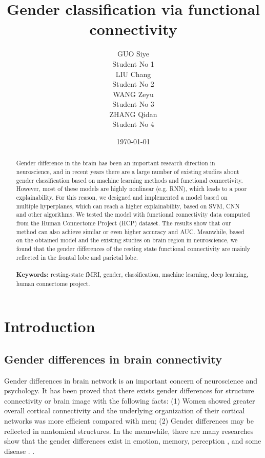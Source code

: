\documentclass[11pt]{article}
\title{\Huge Gender classification via functional connectivity}
\author{
    \parbox{0.2\textwidth}{
        \centering GUO Siye \\
        \centering Student No 1
    }
    \parbox{0.2\textwidth}{
        \centering LIU Chang \\
        \centering Student No 2
    }
    \parbox{0.2\textwidth}{
        \centering WANG Zeyu \\
        \centering Student No 3
    }
    \parbox{0.2\textwidth}{
        \centering ZHANG Qidan \\
        \centering Student No 4
    }
}
\date{\today}
\begin{document}
\maketitle

\begin{abstract}
    Gender difference in the brain has been an important research direction in neuroscience, and in recent years there are a large number of existing studies about gender classification based on machine learning methods and functional connectivity. However, most of these models are highly nonlinear (e.g. RNN), which leads to a poor explainability. For this reason, we designed and implemented a model based on multiple hyperplanes, which can reach a higher explainability, based on SVM, CNN and other algorithms. We tested the model with functional connectivity data computed from the Human Connectome Project (HCP) dataset. The results show that our method can also achieve similar or even higher accuracy and AUC. Meanwhile, based on the obtained model and the existing studies on brain region in neuroscience, we found that the gender differences of the resting state functional connectivity are mainly reflected in the frontal lobe and parietal lobe.
    \\\\
    \textbf{Keywords:} resting-state fMRI, gender, classification, machine learning, deep learning, human connectome project.
\end{abstract}


\newpage

\tableofcontents
\thispagestyle{empty}
\setcounter{page}{0}

\newpage

\section{Introduction}

\subsection{Gender differences in brain connectivity}

Gender differences in brain network is an important concern of neuroscience and psychology. It has been proved that there exists gender differences for structure connectivity or brain image\cite{Gong2009-gu}\cite{Dibaji2023-bn}\cite{Ebel2023-pu} with the following facts: (1) Women showed greater overall cortical connectivity and the underlying organization of their cortical networks was more efficient compared with men; (2) Gender differences may be reflected in anatomical structures. In the meanwhile, there are many researches show that the gender differences exist in emotion\cite{chaplin2013gender}\cite{fischer2018gender}, memory\cite{guillem2005gender}, perception \cite{skaalvik1994gender}\cite{soetanto2006there}\cite{wiesenfeld2005sex}, and some disease \cite{Sendi2023-nu}\cite{Yan2019-yc}. .
\end{document}
